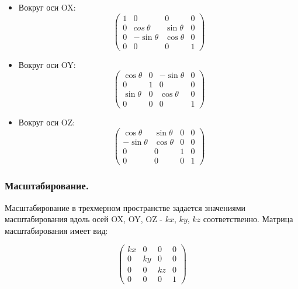 \begin{itemize}[label=---]
	\item Вокруг оси OX:
	\begin{equation}
		\begin{pmatrix}
			1 & 0             & 0            & 0 \\
			0 & cos\ \theta   & \sin{\theta} & 0 \\
			0 & -\sin{\theta} & \cos{\theta} & 0 \\
			0 & 0             & 0            & 1
		\end{pmatrix}
	\end{equation}

	\item Вокруг оси OY:
	\begin{equation}
		\begin{pmatrix}
			\cos{\theta} & 0 & -\sin{\theta} & 0 \\
			0            & 1 & 0             & 0 \\
			\sin{\theta} & 0 & \cos{\theta}  & 0 \\
			0            & 0 & 0             & 1
		\end{pmatrix}
	\end{equation}

	\item Вокруг оси OZ:
	\begin{equation}
		\begin{pmatrix}
			\cos{\theta}  & \sin{\theta} & 0 & 0 \\
			-\sin{\theta} & \cos{\theta} & 0 & 0 \\
			0             & 0            & 1 & 0 \\
			0             & 0            & 0 & 1
		\end{pmatrix}
	\end{equation}
\end{itemize}

\subsubsection*{Масштабирование.}
	
Масштабирование в трехмерном пространстве задается значениями масштабирования вдоль осей OX, OY, OZ - $kx$, $ky$, $kz$ соответственно. Матрица масштабирования имеет вид:

\begin{equation}
	\begin{pmatrix}
		kx & 0  & 0  & 0 \\
		0  & ky & 0  & 0 \\
		0  & 0  & kz & 0 \\
		0  & 0  & 0  & 1
	\end{pmatrix}
\end{equation}
	
